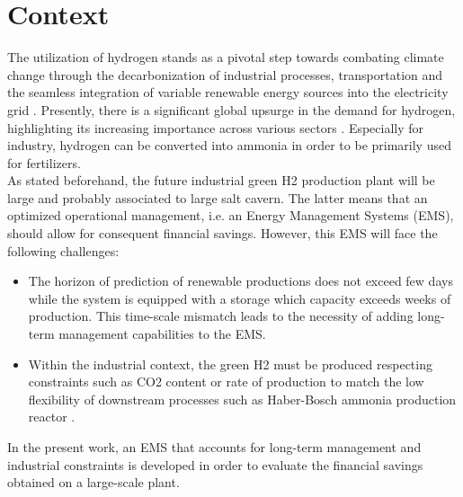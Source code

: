 \section{Context}

The utilization of hydrogen stands as a pivotal step towards combating climate change through the decarbonization of industrial processes, transportation and the seamless integration of variable renewable energy sources into the electricity grid \citep{shukla2022climate}.
Presently, there is a significant global upsurge in the demand for hydrogen, highlighting its increasing importance across various sectors \citep{iea_global_2022}. Especially for industry, hydrogen can be converted into ammonia in order to be primarily used for fertilizers. 
\\
As stated beforehand, the future industrial green H2 production plant will be large and probably associated to large salt cavern. The latter means that an optimized operational management, i.e. an Energy Management Systems (EMS), should allow for consequent financial savings. However, this EMS will face the following challenges: 
\begin{itemize}
    \item The horizon of prediction of renewable productions does not exceed few days while the system is equipped with a storage which capacity exceeds weeks of production. This time-scale mismatch leads to the necessity of adding long-term management capabilities to the EMS.
    \item Within the industrial context, the green H2 must be produced respecting constraints such as CO2 content \citep{green_hydrogen_organisation_green_2023} or rate of production to match the low flexibility of downstream processes such as Haber-Bosch ammonia production reactor \citep{shamiri_modeling_2021}.
\end{itemize}
In the present work, an EMS that accounts for long-term management and industrial constraints is developed in order to evaluate the financial savings obtained on a large-scale plant.
